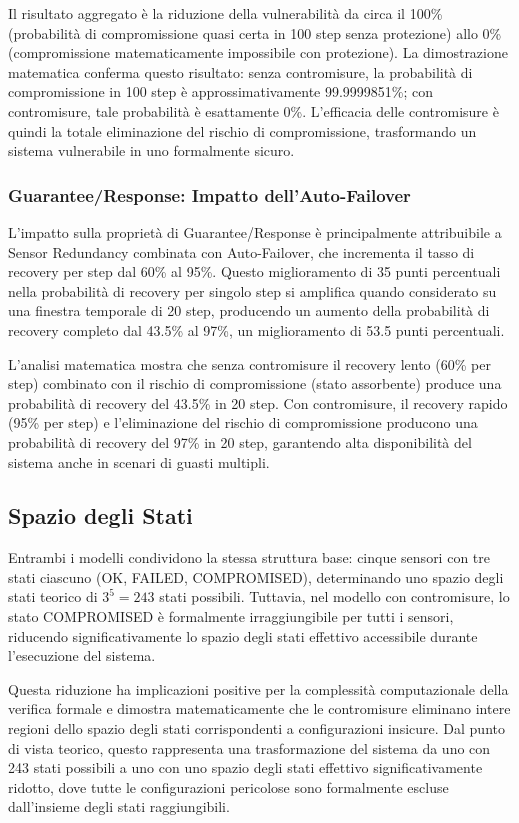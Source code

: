 Il risultato aggregato è la riduzione della vulnerabilità da circa il 100\% (probabilità di compromissione quasi certa in 100 step senza protezione) allo 0\% (compromissione matematicamente impossibile con protezione). La dimostrazione matematica conferma questo risultato: senza contromisure, la probabilità di compromissione in 100 step è approssimativamente 99.9999851\%; con contromisure, tale probabilità è esattamente 0\%. L'efficacia delle contromisure è quindi la totale eliminazione del rischio di compromissione, trasformando un sistema vulnerabile in uno formalmente sicuro.

\subsubsection{Guarantee/Response: Impatto dell'Auto-Failover}
L'impatto sulla proprietà di Guarantee/Response è principalmente attribuibile a Sensor Redundancy combinata con Auto-Failover, che incrementa il tasso di recovery per step dal 60\% al 95\%. Questo miglioramento di 35 punti percentuali nella probabilità di recovery per singolo step si amplifica quando considerato su una finestra temporale di 20 step, producendo un aumento della probabilità di recovery completo dal 43.5\% al 97\%, un miglioramento di 53.5 punti percentuali.

L'analisi matematica mostra che senza contromisure il recovery lento (60\% per step) combinato con il rischio di compromissione (stato assorbente) produce una probabilità di recovery del 43.5\% in 20 step. Con contromisure, il recovery rapido (95\% per step) e l'eliminazione del rischio di compromissione producono una probabilità di recovery del 97\% in 20 step, garantendo alta disponibilità del sistema anche in scenari di guasti multipli.

\subsection{Spazio degli Stati}
Entrambi i modelli condividono la stessa struttura base: cinque sensori con tre stati ciascuno (OK, FAILED, COMPROMISED), determinando uno spazio degli stati teorico di $3^5 = 243$ stati possibili. Tuttavia, nel modello con contromisure, lo stato COMPROMISED è formalmente irraggiungibile per tutti i sensori, riducendo significativamente lo spazio degli stati effettivo accessibile durante l'esecuzione del sistema.

Questa riduzione ha implicazioni positive per la complessità computazionale della verifica formale e dimostra matematicamente che le contromisure eliminano intere regioni dello spazio degli stati corrispondenti a configurazioni insicure. Dal punto di vista teorico, questo rappresenta una trasformazione del sistema da uno con 243 stati possibili a uno con uno spazio degli stati effettivo significativamente ridotto, dove tutte le configurazioni pericolose sono formalmente escluse dall'insieme degli stati raggiungibili.

